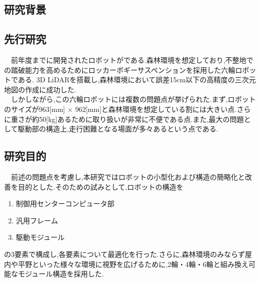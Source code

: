 \subsection{研究背景}


\subsection{先行研究}
\ \ 前年度までに開発されたロボットが\label{six_rober}である.森林環境を想定しており,不整地での踏破能力を高めるためにロッカーボギーサスペンションを採用した六輪ロボットである.
3D LiDARを搭載し,森林環境において誤差15cm以下の高精度の三次元地図の作成に成功した.\cite{arita}\\
\ \ しかしながら,この六輪ロボットには複数の問題点が挙げられた.まず,ロボットのサイズが963[mm] $\times$ 962[mm]と森林環境を想定している割には大きい点.さらに重さが約50[kg]あるために取り扱いが非常に不便である点.また,最大の問題として駆動部の構造上,走行困難となる場面が多々あるという点である.\label{problem}

\subsection{研究目的}
\ \ 前述の問題点を考慮し,本研究ではロボットの小型化および構造の簡略化と改善を目的とした.そのための試みとして,ロボットの構造を
\begin{enumerate}
	\item 制御用センターコンピュータ部
	\item 汎用フレーム
	\item 駆動モジュール
\end{enumerate}
の3要素で構成し,各要素について最適化を行った.さらに,森林環境のみならず屋内や平野といった様々な環境に視野を広げるために,2輪・4輪・6輪と組み換え可能なモジュール構造を採用した.